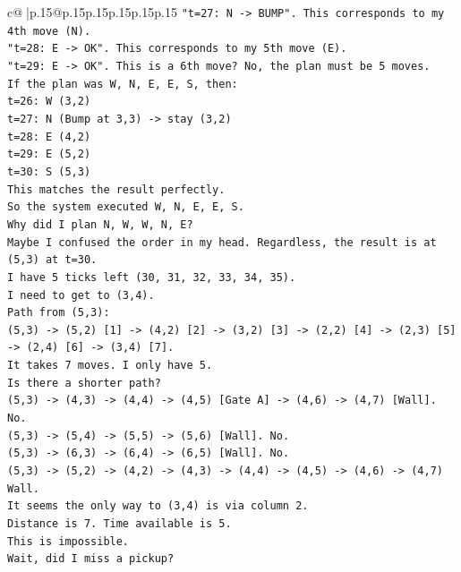 \documentclass{article}
\begin{document}
{\begin{supertabular}{c@{$\;$}|p{.15\linewidth}@{}p{.15\linewidth}p{.15\linewidth}p{.15\linewidth}p{.15\linewidth}p{.15\linewidth}}
{{{\texttt{"t=27: N {-}> BUMP". This corresponds to my 4th move (N).} \\
\texttt{"t=28: E {-}> OK". This corresponds to my 5th move (E).} \\
\texttt{"t=29: E {-}> OK". This is a 6th move? No, the plan must be 5 moves.} \\
\texttt{If the plan was W, N, E, E, S, then:} \\
\texttt{t=26: W (3,2)} \\
\texttt{t=27: N (Bump at 3,3) {-}> stay (3,2)} \\
\texttt{t=28: E (4,2)} \\
\texttt{t=29: E (5,2)} \\
\texttt{t=30: S (5,3)} \\
\texttt{This matches the result perfectly.} \\
\texttt{So the system executed W, N, E, E, S.} \\
\texttt{Why did I plan N, W, W, N, E?} \\
\texttt{Maybe I confused the order in my head. Regardless, the result is at (5,3) at t=30.} \\
\texttt{I have 5 ticks left (30, 31, 32, 33, 34, 35).} \\
\texttt{I need to get to (3,4).} \\
\texttt{Path from (5,3):} \\
\texttt{(5,3) {-}> (5,2) {[}1{]} {-}> (4,2) {[}2{]} {-}> (3,2) {[}3{]} {-}> (2,2) {[}4{]} {-}> (2,3) {[}5{]} {-}> (2,4) {[}6{]} {-}> (3,4) {[}7{]}.} \\
\texttt{It takes 7 moves. I only have 5.} \\
\texttt{Is there a shorter path?} \\
\texttt{(5,3) {-}> (4,3) {-}> (4,4) {-}> (4,5) {[}Gate A{]} {-}> (4,6) {-}> (4,7) {[}Wall{]}. No.} \\
\texttt{(5,3) {-}> (5,4) {-}> (5,5) {-}> (5,6) {[}Wall{]}. No.} \\
\texttt{(5,3) {-}> (6,3) {-}> (6,4) {-}> (6,5) {[}Wall{]}. No.} \\
\texttt{(5,3) {-}> (5,2) {-}> (4,2) {-}> (4,3) {-}> (4,4) {-}> (4,5) {-}> (4,6) {-}> (4,7) Wall.} \\
\texttt{It seems the only way to (3,4) is via column 2.} \\
\texttt{Distance is 7. Time available is 5.} \\
\texttt{This is impossible.} \\
\texttt{Wait, did I miss a pickup?} \\
}}}
\end{supertabular}}
\end{document}
